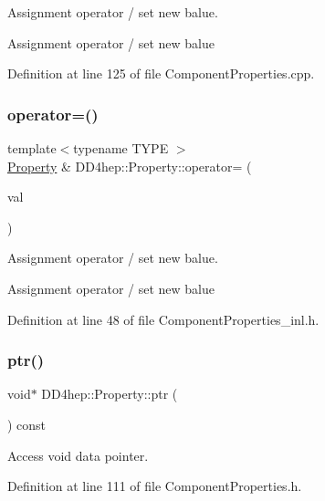 Assignment operator / set new balue. 

Assignment operator / set new balue 

Definition at line 125 of file Component\+Properties.\+cpp.

\hypertarget{class_d_d4hep_1_1_property_ae8fa36300ef0ce1673dcf70bda7e953e}{}\label{class_d_d4hep_1_1_property_ae8fa36300ef0ce1673dcf70bda7e953e} 
\subsubsection{\texorpdfstring{operator=()}{operator=()}\hspace{0.1cm}{\footnotesize\ttfamily [3/3]}}
{\footnotesize\ttfamily template$<$typename T\+Y\+PE $>$ \\
\hyperlink{class_d_d4hep_1_1_property}{Property} \& D\+D4hep\+::\+Property\+::operator= (\begin{DoxyParamCaption}\item[{const T\+Y\+PE \&}]{val }\end{DoxyParamCaption})}



Assignment operator / set new balue. 

Assignment operator / set new balue 

Definition at line 48 of file Component\+Properties\+\_\+inl.\+h.

\hypertarget{class_d_d4hep_1_1_property_a10b0611f5f1ac530fccf6ff4def6d4fa}{}\label{class_d_d4hep_1_1_property_a10b0611f5f1ac530fccf6ff4def6d4fa} 
\subsubsection{\texorpdfstring{ptr()}{ptr()}}
{\footnotesize\ttfamily void$\ast$ D\+D4hep\+::\+Property\+::ptr (\begin{DoxyParamCaption}{ }\end{DoxyParamCaption}) const\hspace{0.3cm}{\ttfamily [inline]}}



Access void data pointer. 



Definition at line 111 of file Component\+Properties.\+h.




